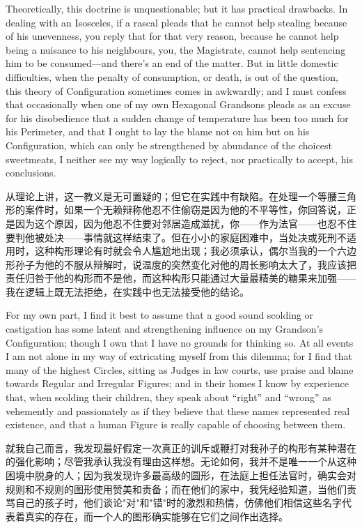 \documentclass[12pt,UTF8]{ctexbook}
\begin{document}
Theoretically, this doctrine is unquestionable; but it has practical drawbacks. In dealing with an Isosceles, if a rascal pleads that he cannot help stealing because of his unevenness, you reply that for that very reason, because he cannot help being a nuisance to his neighbours, you, the Magistrate, cannot help sentencing him to be consumed---and there's an end of the matter. But in little domestic difficulties, when the penalty of consumption, or death, is out of the question, this theory of Configuration sometimes comes in awkwardly; and I must confess that occasionally when one of my own Hexagonal Grandsons pleads as an excuse for his disobedience that a sudden change of temperature has been too much for his Perimeter, and that I ought to lay the blame not on him but on his Configuration, which can only be strengthened by abundance of the choicest sweetmeats, I neither see my way logically to reject, nor practically to accept, his conclusions.

从理论上讲，这一教义是无可置疑的；但它在实践中有缺陷。在处理一个等腰三角形的案件时，如果一个无赖辩称他忍不住偷窃是因为他的不平等性，你回答说，正是因为这个原因，因为他忍不住要对邻居造成滋扰，你——作为法官——也忍不住要判他被处决——事情就这样结束了。但在小小的家庭困难中，当处决或死刑不适用时，这种构形理论有时就会令人尴尬地出现；我必须承认，偶尔当我的一个六边形孙子为他的不服从辩解时，说温度的突然变化对他的周长影响太大了，我应该把责任归咎于他的构形而不是他，而这种构形只能通过大量最精美的糖果来加强——我在逻辑上既无法拒绝，在实践中也无法接受他的结论。

For my own part, I find it best to assume that a good sound scolding or castigation has some latent and strengthening influence on my Grandson's Configuration; though I own that I have no grounds for thinking so. At all events I am not alone in my way of extricating myself from this dilemma; for I find that many of the highest Circles, sitting as Judges in law courts, use praise and blame towards Regular and Irregular Figures; and in their homes I know by experience that, when scolding their children, they speak about ``right'' and ``wrong'' as vehemently and passionately as if they believe that these names represented real existence, and that a human Figure is really capable of choosing between them.

就我自己而言，我发现最好假定一次真正的训斥或鞭打对我孙子的构形有某种潜在的强化影响；尽管我承认我没有理由这样想。无论如何，我并不是唯一一个从这种困境中脱身的人；因为我发现许多最高级的圆形，在法庭上担任法官时，确实会对规则和不规则的图形使用赞美和责备；而在他们的家中，我凭经验知道，当他们责骂自己的孩子时，他们谈论"对"和"错"时的激烈和热情，仿佛他们相信这些名字代表着真实的存在，而一个人的图形确实能够在它们之间作出选择。
\end{document}

